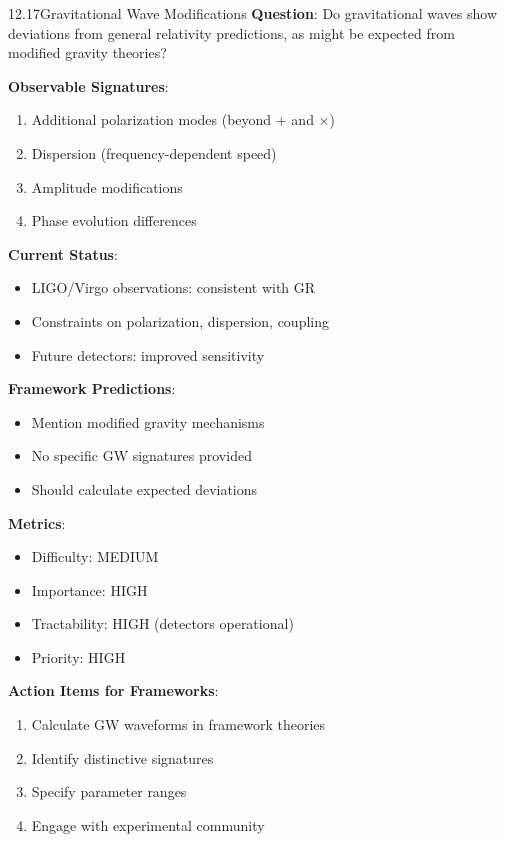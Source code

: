 \begin{openproblem}{12.17}{Gravitational Wave Modifications}
\textbf{Question}: Do gravitational waves show deviations from general relativity predictions, as might be expected from modified gravity theories?

\textbf{Observable Signatures}:
\begin{enumerate}
    \item Additional polarization modes (beyond + and $\times$)
    \item Dispersion (frequency-dependent speed)
    \item Amplitude modifications
    \item Phase evolution differences
\end{enumerate}

\textbf{Current Status}:
\begin{itemize}
    \item LIGO/Virgo observations: consistent with GR
    \item Constraints on polarization, dispersion, coupling
    \item Future detectors: improved sensitivity
\end{itemize}

\textbf{Framework Predictions}:
\begin{itemize}
    \item Mention modified gravity mechanisms
    \item No specific GW signatures provided
    \item Should calculate expected deviations
\end{itemize}

\textbf{Metrics}:
\begin{itemize}
    \item Difficulty: MEDIUM
    \item Importance: HIGH
    \item Tractability: HIGH (detectors operational)
    \item Priority: HIGH
\end{itemize}

\textbf{Action Items for Frameworks}:
\begin{enumerate}
    \item Calculate GW waveforms in framework theories
    \item Identify distinctive signatures
    \item Specify parameter ranges
    \item Engage with experimental community
\end{enumerate}
\end{openproblem}

